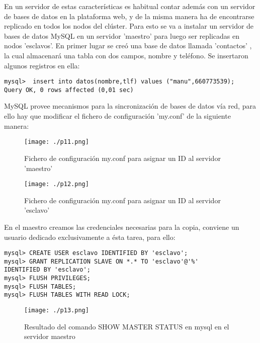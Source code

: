 \documentclass[paper=a4, fontsize=12pt]{scrartcl} %
\begin{document}
En un servidor de estas características es habitual contar además con un servidor de bases de datos en la plataforma web, y de la misma manera ha de encontrarse replicado en todos los nodos del clúster. Para esto se va a instalar un servidor de bases de datos MySQL en un servidor 'maestro' para luego ser replicadas en nodos 'esclavos'.
En primer lugar se creó una base de datos llamada 'contactos' , la cual almacenará una tabla con dos campos, nombre y teléfono. Se insertaron algunos registros en ella:

\begin{lstlisting}
mysql>  insert into datos(nombre,tlf) values ("manu",660773539);
Query OK, 0 rows affected (0,01 sec)
\end{lstlisting}

MySQL provee mecanismos para la sincronización de bases de datos vía red, para ello hay que modificar el fichero de configuración 'my.conf' de la siguiente manera:

\begin{figure}[H] %
	\centering
	\label{lsblk}
	\texttt{[image: ./p11.png]}
	\caption{Fichero de configuración my.conf para asignar un ID al servidor 'maestro'} 
\end{figure}

\begin{figure}[H] %
	\centering
	\label{lsblk}
	\texttt{[image: ./p12.png]}
	\caption{Fichero de configuración my.conf para asignar un ID al servidor 'esclavo'} 
\end{figure}

En el maestro creamos las credenciales necesarias para la copia, conviene un usuario dedicado exclusivamente a ésta tarea, para ello:
\begin{lstlisting}
mysql> CREATE USER esclavo IDENTIFIED BY 'esclavo';
mysql> GRANT REPLICATION SLAVE ON *.* TO 'esclavo'@'%'
IDENTIFIED BY 'esclavo';
mysql> FLUSH PRIVILEGES;
mysql> FLUSH TABLES;
mysql> FLUSH TABLES WITH READ LOCK;
\end{lstlisting}

\begin{figure}[H] %
	\centering
	\label{lsblk}
	\texttt{[image: ./p13.png]}
	\caption{Resultado del comando SHOW MASTER STATUS en mysql en el servidor maestro} 
\end{figure}
\end{document}
